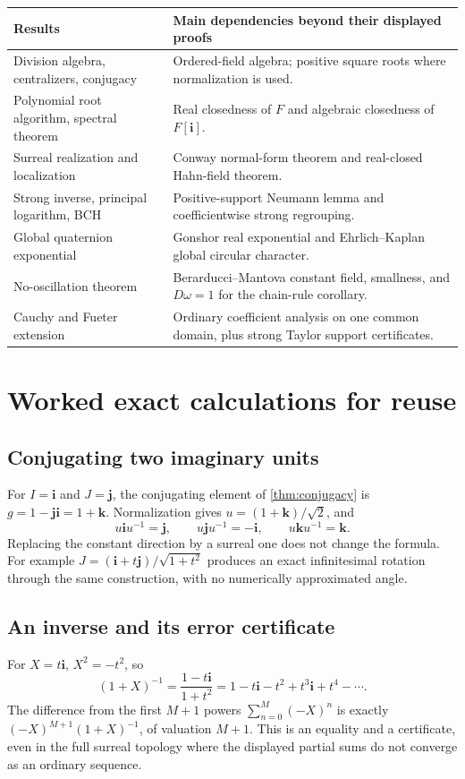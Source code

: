 \documentclass[11pt,letterpaper]{article}
\numberwithin{equation}{section}
\theoremstyle{definition}
\theoremstyle{remark}
\newcommand{\ii}{\mathbf i}
\newcommand{\jj}{\mathbf j}
\newcommand{\kk}{\mathbf k}
\begin{document}
\begin{center}\small
\begin{tabular}{L{0.36\textwidth}L{0.54\textwidth}}
\toprule
Results & Main dependencies beyond their displayed proofs\\
\midrule
Division algebra, centralizers, conjugacy & Ordered-field algebra; positive square roots where
normalization is used.\\
Polynomial root algorithm, spectral theorem & Real closedness of $F$ and algebraic closedness
of $F[\ii]$.\\
Surreal realization and localization & Conway normal-form theorem and real-closed Hahn-field
theorem.\\
Strong inverse, principal logarithm, BCH & Positive-support Neumann lemma and coefficientwise
strong regrouping.\\
Global quaternion exponential & Gonshor real exponential and Ehrlich--Kaplan global circular
character.\\
No-oscillation theorem & Berarducci--Mantova constant field, smallness, and $D\omega=1$ for
the chain-rule corollary.\\
Cauchy and Fueter extension & Ordinary coefficient analysis on one common domain, plus strong
Taylor support certificates.\\
\bottomrule
\end{tabular}
\end{center}

\section{Worked exact calculations for reuse}\label{app:calculations}

\subsection{Conjugating two imaginary units}
For $I=\ii$ and $J=\jj$, the conjugating element of \cref{thm:conjugacy} is
$g=1-\jj\ii=1+\kk$. Normalization gives $u=(1+\kk)/\sqrt2$, and
\[
 u\ii u^{-1}=\jj,\qquad u\jj u^{-1}=-\ii,\qquad u\kk u^{-1}=\kk.
\]
Replacing the constant direction by a surreal one does not change the formula. For example
$J=(\ii+t\jj)/\sqrt{1+t^2}$ produces an exact infinitesimal rotation through the same
construction, with no numerically approximated angle.

\subsection{An inverse and its error certificate}
For $X=t\ii$, $X^2=-t^2$, so
\[
 (1+X)^{-1}=\frac{1-t\ii}{1+t^2}
 =1-t\ii-t^2+t^3\ii+t^4-\cdots.
\]
The difference from the first $M+1$ powers $\sum_{n=0}^M(-X)^n$ is exactly
$(-X)^{M+1}(1+X)^{-1}$, of valuation $M+1$. This is an equality and a certificate, even
in the full surreal topology where the displayed partial sums do not converge as an ordinary
sequence.
\end{document}
